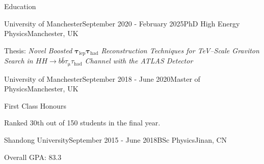 \documentclass{resume} %
\begin{document}
    \begin{rSection}{Education}
        \begin{rSubsection}{University of Manchester}{September 2020 - February 2025}{PhD High Energy Physics}{Manchester, UK}
            \item Thesis: \textit{Novel Boosted $\mathbf{\tau}_\mathrm{lep}\mathbf{\tau}_\mathrm{had}$ Reconstruction Techniques for 
                TeV--Scale Graviton Search in $HH\rightarrow {b}{\bar{b}}{\tau}_\mathrm{\mu}{\tau}_\mathrm{had}$ Channel with the ATLAS Detector}
        \end{rSubsection}
        \begin{rSubsection}{University of Manchester}{September 2018 - June 2020}{Master of Physics}{Manchester, UK}
            \item First Class Honours
            \item Ranked 30th out of 150 students in the final year.
        \end{rSubsection}
        \begin{rSubsection}{Shandong University}{September 2015 - June 2018}{BSc Physics}{Jinan, CN}
            \item Overall GPA: 83.3
        \end{rSubsection}
    \end{rSection}
\end{document}
